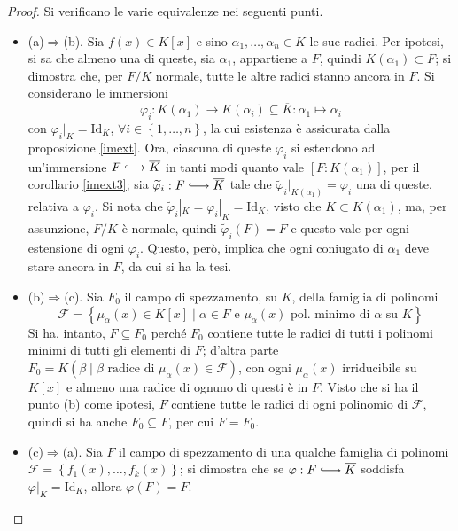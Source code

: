 \documentclass[12pt]{scrartcl}
\theoremstyle{style}
\numberwithin{equation}{subsection}
\newcommand{\longhookrightarrow}{\lhook\joinrel\longrightarrow}
\begin{document}
\begin{proof}
	Si verificano le varie equivalenze nei seguenti punti.
	\begin{itemize}
		\item (a)$\Rightarrow $(b). Sia $f(x) \in K[x]$ e sino $\alpha _1,\ldots, \alpha _n \in \overline{K}$ le sue radici.
			Per ipotesi, si sa che almeno una di queste, sia $\alpha _1$, appartiene a $F$, quindi $K(\alpha _1) \subset F$; si dimostra che, per $F / K$ normale, tutte le altre radici stanno ancora in $F$.
Si considerano le immersioni
\[
\varphi _i : K(\alpha _1) \longrightarrow K(\alpha _i) \subseteq \overline{K} : \alpha _1 \longmapsto \alpha _i
\] 
con $\varphi _i|_K = \mathrm{Id} _K$, $\forall i \in \left\{ 1,\ldots,n \right\} $, la cui esistenza \`e assicurata dalla proposizione \ref{imext}.
Ora, ciascuna di queste $\varphi _i$ si estendono ad un'immersione $F \longhookrightarrow \overline{K}$ in tanti modi quanto vale $[F : K(\alpha _1)]$, per il corollario \ref{imext3}; sia $\widetilde{\varphi }_i : F \longhookrightarrow \overline{K}$ tale che $\widetilde{\varphi }_i|_{K(\alpha _1)} = \varphi _i$ una di queste, relativa a $\varphi _i$.
Si nota che $\widetilde{\varphi }_i|_{K} = \varphi _i|_K = \mathrm{Id} _K$, visto che $K \subset K(\alpha _1)$, ma, per assunzione, $F / K$ \`e normale, quindi $\widetilde{\varphi }_i (F) = F$ e questo vale per ogni estensione di ogni $\varphi _i$.
Questo, per\`o, implica che ogni coniugato di $\alpha _1$ deve stare ancora in $F$, da cui si ha la tesi.
\item (b)$\Rightarrow $(c). Sia $F_0$ il campo di spezzamento, su $K$, della famiglia di polinomi
	\[
		\mathcal{F} = \left\{ \mu _\alpha (x) \in K[x]  \mid \alpha \in F \text{ e } \mu _\alpha (x) \text{ pol. minimo di } \alpha \text{ su } K \right\} 
	\] 
	Si ha, intanto, $F \subseteq F_0$ perch\'e $F_0$ contiene tutte le radici di tutti i polinomi minimi di tutti gli elementi di $F$; d'altra parte $F_0= K(\beta  \mid \beta \text{ radice di }\mu _\alpha (x) \in \mathcal{F} )$, con ogni $\mu _\alpha (x)$ irriducibile su $K[x]$ e almeno una radice di ognuno di questi \`e in $F$.
	Visto che si ha il punto (b) come ipotesi, $F$ contiene tutte le radici di ogni polinomio di $\mathcal{F} $, quindi si ha anche $F_0 \subseteq F$, per cui $F =F_0$.
\item (c)$\Rightarrow $(a). Sia $F$ il campo di spezzamento di una qualche famiglia di polinomi $\mathcal{F} =\left\{ f_1(x),\ldots,f_k(x) \right\} $; si dimostra che se $\varphi :F\longhookrightarrow \overline{K}$ soddisfa $\varphi |_K = \mathrm{Id} _K$, allora $\varphi (F) = F$.

\end{itemize}
\end{proof}
\end{document}

